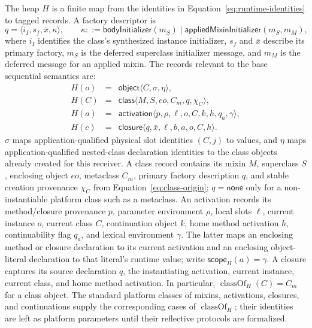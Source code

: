 \documentclass[11pt]{article}
\numberwithin{equation}{section}
\newcommand{\kw}[1]{\ensuremath{\mathsf{#1}}}
\newcommand{\classof}{\mathop{\mathrm{classOf}}}
\begin{document}
The heap $H$ is a finite map from the identities in
Equation~\eqref{eq:runtime-identities} to tagged records.  A factory descriptor
is
\begin{equation}\label{eq:factory-descriptor}
 q=\langle i_I,s_f,\bar x,\kappa\rangle,
 \qquad
 \kappa::=\kw{bodyInitializer}(m_S)\mid
            \kw{appliedMixinInitializer}(m_S,m_M),
\end{equation}
where $i_I$ identifies the class's synthesized instance initializer, $s_f$ and
$\bar x$ describe its primary factory, $m_S$ is the deferred superclass
initializer message, and $m_M$ is the deferred message for an applied mixin.
The records relevant to the base sequential semantics are:
\begin{equation}\label{eq:heap-records}
\begin{array}{rcl}
H(o)&=&\kw{object}\langle C,\sigma,\eta\rangle,\\
H(C)&=&\kw{class}\langle M,S,eo,C_m,q,\chi_C\rangle,\\
H(a)&=&\kw{activation}\langle p,\rho,\ell,o,C,k,h,q_a,\gamma\rangle,\\
H(c)&=&\kw{closure}\langle q,\bar x,\ell,b,a,o,C,h\rangle.
\end{array}
\end{equation}
$\sigma$ maps application-qualified physical slot identities $(C,j)$ to values,
and $\eta$ maps application-qualified nested-class
declaration identities to the class objects already created for this receiver.
A class record contains its mixin $M$, superclass $S$, enclosing object $eo$,
metaclass $C_m$, primary factory description $q$, and stable creation
provenance $\chi_C$ from Equation~\eqref{eq:class-origin};
$q=\kw{none}$ only for a
non-instantiable platform class such as a metaclass.  An activation
records its method/closure provenance $p$, parameter environment $\rho$, local
slots $\ell$, current instance $o$, current class $C$, continuation object $k$,
home method activation $h$, continuability flag $q_a$, and lexical environment
$\gamma$.  The latter maps an enclosing method or closure declaration to its
current activation and an enclosing object-literal declaration to that
literal's runtime value; write $\mathsf{scope}_H(a)=\gamma$.  A closure captures
its source declaration $q$, the instantiating activation, current instance,
current class, and home method activation.
In particular, $\classof_H(C)=C_m$ for a class object.  The standard platform
classes of mixins, activations, closures, and continuations supply the
corresponding cases of $\classof_H$; their identities are left as platform
parameters until their reflective protocols are formalized.
\end{document}
